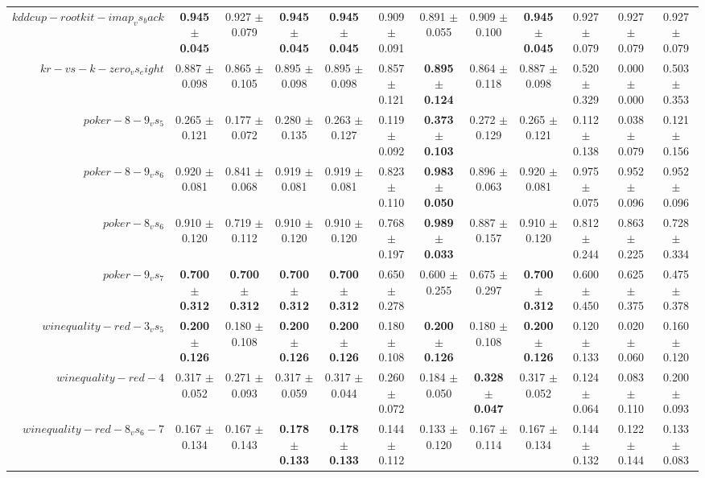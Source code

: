 \begin{table}[!ht]
{\begin{tabular}{r c c c c c c c c c c c}
$kddcup-rootkit-imap_vs_back$ & \textbf{0.945 $\pm$ 0.045} & 0.927 $\pm$ 0.079 & \textbf{0.945 $\pm$ 0.045} & \textbf{0.945 $\pm$ 0.045} & 0.909 $\pm$ 0.091 & 0.891 $\pm$ 0.055 & 0.909 $\pm$ 0.100 & \textbf{0.945 $\pm$ 0.045} & 0.927 $\pm$ 0.079 & 0.927 $\pm$ 0.079 & 0.927 $\pm$ 0.079 \\
$kr-vs-k-zero_vs_eight$ & 0.887 $\pm$ 0.098 & 0.865 $\pm$ 0.105 & 0.895 $\pm$ 0.098 & 0.895 $\pm$ 0.098 & 0.857 $\pm$ 0.121 & \textbf{0.895 $\pm$ 0.124} & 0.864 $\pm$ 0.118 & 0.887 $\pm$ 0.098 & 0.520 $\pm$ 0.329 & 0.000 $\pm$ 0.000 & 0.503 $\pm$ 0.353 \\
$poker-8-9_vs_5$ & 0.265 $\pm$ 0.121 & 0.177 $\pm$ 0.072 & 0.280 $\pm$ 0.135 & 0.263 $\pm$ 0.127 & 0.119 $\pm$ 0.092 & \textbf{0.373 $\pm$ 0.103} & 0.272 $\pm$ 0.129 & 0.265 $\pm$ 0.121 & 0.112 $\pm$ 0.138 & 0.038 $\pm$ 0.079 & 0.121 $\pm$ 0.156 \\
$poker-8-9_vs_6$ & 0.920 $\pm$ 0.081 & 0.841 $\pm$ 0.068 & 0.919 $\pm$ 0.081 & 0.919 $\pm$ 0.081 & 0.823 $\pm$ 0.110 & \textbf{0.983 $\pm$ 0.050} & 0.896 $\pm$ 0.063 & 0.920 $\pm$ 0.081 & 0.975 $\pm$ 0.075 & 0.952 $\pm$ 0.096 & 0.952 $\pm$ 0.096 \\
$poker-8_vs_6$ & 0.910 $\pm$ 0.120 & 0.719 $\pm$ 0.112 & 0.910 $\pm$ 0.120 & 0.910 $\pm$ 0.120 & 0.768 $\pm$ 0.197 & \textbf{0.989 $\pm$ 0.033} & 0.887 $\pm$ 0.157 & 0.910 $\pm$ 0.120 & 0.812 $\pm$ 0.244 & 0.863 $\pm$ 0.225 & 0.728 $\pm$ 0.334 \\
$poker-9_vs_7$ & \textbf{0.700 $\pm$ 0.312} & \textbf{0.700 $\pm$ 0.312} & \textbf{0.700 $\pm$ 0.312} & \textbf{0.700 $\pm$ 0.312} & 0.650 $\pm$ 0.278 & 0.600 $\pm$ 0.255 & 0.675 $\pm$ 0.297 & \textbf{0.700 $\pm$ 0.312} & 0.600 $\pm$ 0.450 & 0.625 $\pm$ 0.375 & 0.475 $\pm$ 0.378 \\
$winequality-red-3_vs_5$ & \textbf{0.200 $\pm$ 0.126} & 0.180 $\pm$ 0.108 & \textbf{0.200 $\pm$ 0.126} & \textbf{0.200 $\pm$ 0.126} & 0.180 $\pm$ 0.108 & \textbf{0.200 $\pm$ 0.126} & 0.180 $\pm$ 0.108 & \textbf{0.200 $\pm$ 0.126} & 0.120 $\pm$ 0.133 & 0.020 $\pm$ 0.060 & 0.160 $\pm$ 0.120 \\
$winequality-red-4$ & 0.317 $\pm$ 0.052 & 0.271 $\pm$ 0.093 & 0.317 $\pm$ 0.059 & 0.317 $\pm$ 0.044 & 0.260 $\pm$ 0.072 & 0.184 $\pm$ 0.050 & \textbf{0.328 $\pm$ 0.047} & 0.317 $\pm$ 0.052 & 0.124 $\pm$ 0.064 & 0.083 $\pm$ 0.110 & 0.200 $\pm$ 0.093 \\
$winequality-red-8_vs_6-7$ & 0.167 $\pm$ 0.134 & 0.167 $\pm$ 0.143 & \textbf{0.178 $\pm$ 0.133} & \textbf{0.178 $\pm$ 0.133} & 0.144 $\pm$ 0.112 & 0.133 $\pm$ 0.120 & 0.167 $\pm$ 0.114 & 0.167 $\pm$ 0.134 & 0.144 $\pm$ 0.132 & 0.122 $\pm$ 0.144 & 0.133 $\pm$ 0.083 \\

\end{tabular}}
\end{table}
